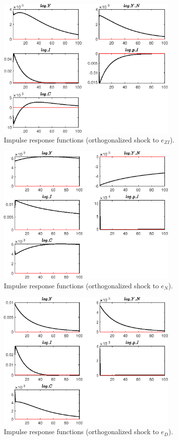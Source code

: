 \begin{figure}[H]
\centering 
\includegraphics[width=0.80\textwidth]{BRS_growth/graphs/BRS_growth_IRF_e_ZI}
\caption{Impulse response functions (orthogonalized shock to ${e_{ZI}}$).}
\label{Fig:IRF:e_ZI}
\end{figure}
 
\begin{figure}[H]
\centering 
\includegraphics[width=0.80\textwidth]{BRS_growth/graphs/BRS_growth_IRF_e_N}
\caption{Impulse response functions (orthogonalized shock to ${e_N}$).}
\label{Fig:IRF:e_N}
\end{figure}
 
\begin{figure}[H]
\centering 
\includegraphics[width=0.80\textwidth]{BRS_growth/graphs/BRS_growth_IRF_e_D}
\caption{Impulse response functions (orthogonalized shock to ${e_D}$).}
\label{Fig:IRF:e_D}
\end{figure}
 
 
